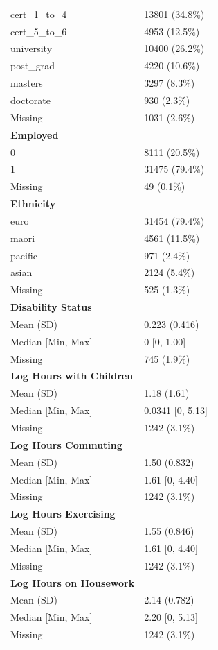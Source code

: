 \documentclass[
  single column]{article}
\begin{document}
\begin{longtable}[]{@{}ll@{}}
cert\_1\_to\_4 & 13801 (34.8\%) \\
cert\_5\_to\_6 & 4953 (12.5\%) \\
university & 10400 (26.2\%) \\
post\_grad & 4220 (10.6\%) \\
masters & 3297 (8.3\%) \\
doctorate & 930 (2.3\%) \\
Missing & 1031 (2.6\%) \\
\textbf{Employed} & \\
0 & 8111 (20.5\%) \\
1 & 31475 (79.4\%) \\
Missing & 49 (0.1\%) \\
\textbf{Ethnicity} & \\
euro & 31454 (79.4\%) \\
maori & 4561 (11.5\%) \\
pacific & 971 (2.4\%) \\
asian & 2124 (5.4\%) \\
Missing & 525 (1.3\%) \\
\textbf{Disability Status} & \\
Mean (SD) & 0.223 (0.416) \\
Median {[}Min, Max{]} & 0 {[}0, 1.00{]} \\
Missing & 745 (1.9\%) \\
\textbf{Log Hours with Children} & \\
Mean (SD) & 1.18 (1.61) \\
Median {[}Min, Max{]} & 0.0341 {[}0, 5.13{]} \\
Missing & 1242 (3.1\%) \\
\textbf{Log Hours Commuting} & \\
Mean (SD) & 1.50 (0.832) \\
Median {[}Min, Max{]} & 1.61 {[}0, 4.40{]} \\
Missing & 1242 (3.1\%) \\
\textbf{Log Hours Exercising} & \\
Mean (SD) & 1.55 (0.846) \\
Median {[}Min, Max{]} & 1.61 {[}0, 4.40{]} \\
Missing & 1242 (3.1\%) \\
\textbf{Log Hours on Housework} & \\
Mean (SD) & 2.14 (0.782) \\
Median {[}Min, Max{]} & 2.20 {[}0, 5.13{]} \\
Missing & 1242 (3.1\%) \\

\end{longtable}
\end{document}
